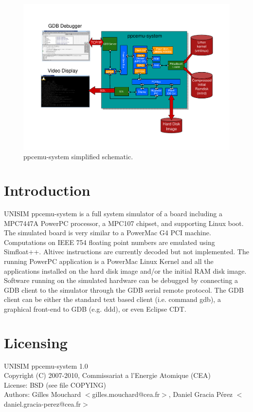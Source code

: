 \begin{figure}[!h]
	\begin{center}
		\includegraphics[width=\textwidth]{ppcemu_system/fig_ppcemu_system.pdf}
	\end{center}
	\caption{ppcemu-system simplified schematic.}
	\label{fig:ppcemu_system}
\end{figure}

\section{Introduction}
UNISIM ppcemu-system is a full system simulator of a board including a MPC7447A PowerPC processor, a MPC107 chipset, and supporting Linux boot. The simulated board is very similar to a PowerMac G4 PCI machine. Computations on IEEE 754 floating point numbers are emulated using Simfloat++. Altivec instructions are currently decoded but not implemented. The running PowerPC application is a PowerMac Linux Kernel and all the applications installed on the hard disk image and/or the initial RAM disk image. Software running on the simulated hardware can be debugged by connecting a GDB client to the simulator through the GDB serial remote protocol. The GDB client can be either the standard text based client (i.e. command gdb), a graphical front-end to GDB (e.g. ddd), or even Eclipse CDT.
\section{Licensing}
UNISIM ppcemu-system 1.0\\
Copyright (C) 2007-2010, Commissariat a l'Energie Atomique (CEA)\\
License: BSD (see file COPYING)\\
Authors: Gilles Mouchard $<$gilles.mouchard@cea.fr$>$, Daniel Gracia P\'erez $<$daniel.gracia-perez@cea.fr$>$\\
